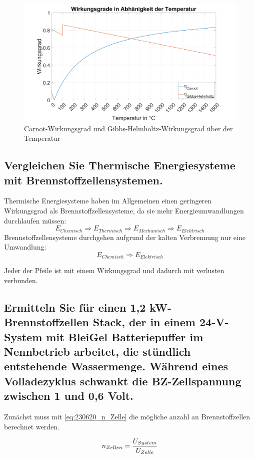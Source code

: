 \begin{figure}[H]
    \centering
    \includegraphics[width=\textwidth]{Abbildungen/Wirkungsgrade.png}
    \caption{Carnot-Wirkungsgrad und Gibbs-Helmholtz-Wirkungsgrad über der Temperatur}
    \label{fig:230620_Wirkungsgrade}
\end{figure}

\subsection{Vergleichen Sie Thermische Energiesysteme mit Brennstoffzellensystemen.}

Thermische Energiesysteme haben im Allgemeinen einen geringeren Wirkungsgrad als Brennstoffzellensysteme, da sie  mehr Energieumwandlungen durchlaufen müssen:
$$E_{Chemisch} \Rightarrow E_{Thermisch} \Rightarrow E_{Mechanisch} \Rightarrow E_{Elektrisch}$$ 
Brennstoffzellensysteme durchgehen aufgrund der kalten Verbrennung nur eine Umwandlung:
$$E_{Chemisch} \Rightarrow E_{Elektrisch}$$

Jeder der Pfeile ist mit einem Wirkungsgrad und dadurch mit verlusten verbunden.

\subsection{Ermitteln Sie für einen 1,2 kW-Brennstoffzellen Stack, der in einem 24-V-System mit
BleiGel Batteriepuffer im Nennbetrieb arbeitet, die stündlich entstehende Wassermenge.
Während eines Volladezyklus schwankt die BZ-Zellspannung zwischen 1 und 0,6 Volt.}
\label{sec:VF_H2O_Menge}

Zunächst muss mit \autoref{eq:230620_n_Zelle} die mögliche anzahl an Brennstoffzellen berechnet werden.

\begin{equation}
    n_{Zellen} = \frac{U_{System}}{U_{Zelle}}\\
    \label{eq:230620_n_Zelle}
\end{equation}

